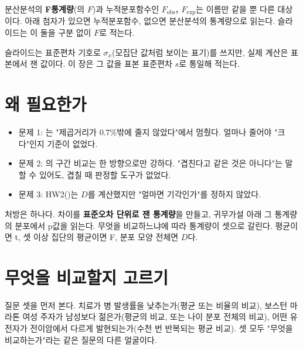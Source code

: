 \begin{pitfall}
분산분석의 \textbf{F통계량}(의 $F$)과 누적분포함수인
\textbf{$F_{\text{obs}}$, $F_{\text{exp}}$}는 이름만 같을 뿐 다른
대상이다. 아래 첨자가 있으면 누적분포함수, 없으면 분산분석의 통계량으로
읽는다. 슬라이드는 이 둘을 구분 없이 $F$로 적는다.
\end{pitfall}

슬라이드는 표준편차 기호로 $\sigma_x$(모집단 값처럼 보이는 표기)를 쓰지만,
실제 계산은 표본에서 잰 값이다. 이 장은 그 값을 표본 표준편차 $s$로
통일해 적는다.

\section{왜 필요한가}
\label{sec:cd-why}

\begin{itemize}
  \item 문제 1: 는 "제곱거리가 $0.7\%$밖에 줄지
        않았다"에서 멈췄다. 얼마나 줄어야 "크다"인지 기준이 없었다.
  \item 문제 2: 의 구간 비교는 한 방향으로만
        강하다. "겹친다고 같은 것은 아니다"는 말할 수 있어도, 겹칠 때
        판정할 도구가 없었다.
  \item 문제 3: HW2()는 $D$를 계산했지만
        "얼마면 기각인가"를 정하지 않았다.
\end{itemize}

처방은 하나다. 차이를 \textbf{표준오차 단위로 잰 통계량}을 만들고,
귀무가설 아래 그 통계량의 분포에서 p값을 읽는다. 무엇을 비교하느냐에
따라 통계량이 셋으로 갈린다. 평균이면 t, 셋 이상 집단의 평균이면 F,
분포 모양 전체면 $D$다.

\section{무엇을 비교할지 고르기}
\label{sec:cd-choose}

질문 셋을 먼저 본다. 치료가 병 발생률을 낮추는가(평균 또는 비율의
비교), 보스턴 마라톤 여성 주자가 남성보다 젊은가(평균의 비교, 또는
나이 분포 전체의 비교), 어떤 유전자가 전이암에서 다르게 발현되는가(수천
번 반복되는 평균 비교). 셋 모두 "무엇을 비교하는가"라는 같은 질문의
다른 얼굴이다.


